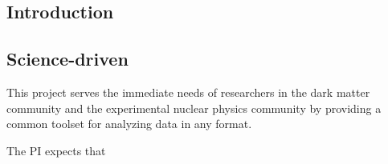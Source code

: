 



\subsection{Introduction}

\subsection{Science-driven}

This project serves the immediate needs of researchers in the dark matter community and the experimental nuclear physics community by providing a common toolset for analyzing data in any format.

The PI expects that

